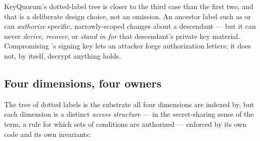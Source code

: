 KeyQuorum's dotted-label tree is closer to the third case than the first
two, and that is a deliberate design choice, not an omission. An ancestor
label such as  or  can \emph{authorize} specific,
narrowly-scoped changes about a descendant --- but it can never
\emph{derive}, \emph{recover}, or \emph{stand in for} that descendant's
private key material. Compromising 's signing key lets an attacker
forge authorization letters; it does not, by itself, decrypt anything
 holds.

\subsection{Four dimensions, four owners}

The tree of dotted labels is the substrate all four dimensions are indexed
by, but each dimension is a distinct \emph{access structure} --- in the
secret-sharing sense of the term, a rule for which sets of conditions are
authorized --- enforced by its own code and its own invariants:

